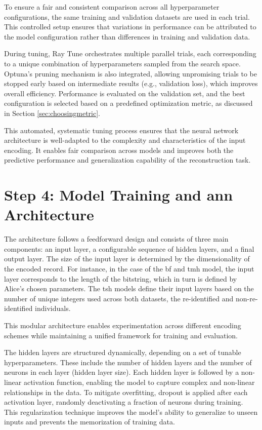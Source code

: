 To ensure a fair and consistent comparison across all hyperparameter configurations, the same training and validation datasets are used in each trial.
This controlled setup ensures that variations in performance can be attributed to the model configuration rather than differences in training and validation data.

During tuning, Ray Tune orchestrates multiple parallel trials, each corresponding to a unique combination of hyperparameters sampled from the search space.
Optuna's pruning mechanism is also integrated, allowing unpromising trials to be stopped early based on intermediate results (e.g., validation loss), which improves overall efficiency.
Performance is evaluated on the validation set, and the best configuration is selected based on a predefined optimization metric, as discussed in Section \ref{sec:choosingmetric}.

This automated, systematic tuning process ensures that the neural network architecture is well-adapted to the complexity and characteristics of the input encoding.
It enables fair comparison across models and improves both the predictive performance and generalization capability of the reconstruction task.

\section{Step 4: Model Training and \ac{ann} Architecture}

The architecture follows a feedforward design and consists of three main components: an input layer, a configurable sequence of hidden layers, and a final output layer.
The size of the input layer is determined by the dimensionality of the encoded record.
For instance, in the case of the \ac{bf} and \ac{tmh} model, the input layer corresponds to the length of the bitstring, which in turn is defined by Alice’s chosen parameters.
The \ac{tsh} models define their input layers based on the number of unique integers used across both datasets, the re-identified and non-re-identified individuals.

This modular architecture enables experimentation across different encoding schemes while maintaining a unified framework for training and evaluation.

The hidden layers are structured dynamically, depending on a set of tunable hyperparameters.
These include the number of hidden layers and the number of neurons in each layer (hidden layer size).
Each hidden layer is followed by a non-linear activation function, enabling the model to capture complex and non-linear relationships in the data.
To mitigate overfitting, dropout is applied after each activation layer, randomly deactivating a fraction of neurons during training.
This regularization technique improves the model's ability to generalize to unseen inputs and prevents the memorization of training data.

